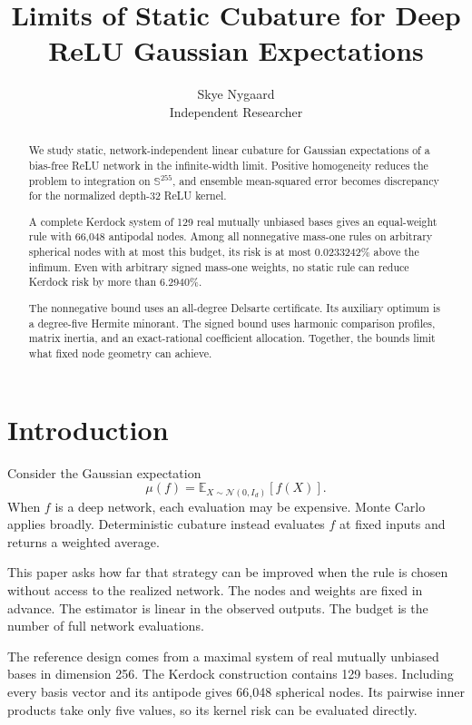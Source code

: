 \documentclass[11pt]{article}
\title{Limits of Static Cubature for Deep ReLU Gaussian Expectations}
\author{Skye Nygaard\\\small Independent Researcher}
\date{}
\begin{document}
\maketitle
\begin{abstract}
We study static, network-independent linear cubature for Gaussian
expectations of a bias-free ReLU network in the infinite-width limit.
Positive homogeneity reduces the problem to integration on
\(\mathbb{S}^{255}\), and ensemble mean-squared error becomes discrepancy
for the normalized depth-32 ReLU kernel.

A complete Kerdock system of 129 real mutually unbiased bases gives an
equal-weight rule with 66,048 antipodal nodes. Among all nonnegative
mass-one rules on arbitrary spherical nodes with at most this budget, its
risk is at most 0.0233242\% above the infimum. Even with arbitrary signed
mass-one weights, no static rule can reduce Kerdock risk by more than
6.2940\%.

The nonnegative bound uses an all-degree Delsarte certificate. Its auxiliary
optimum is a degree-five Hermite minorant. The signed bound uses harmonic
comparison profiles, matrix inertia, and an exact-rational coefficient
allocation. Together, the bounds limit what fixed node geometry can achieve.
\end{abstract}

\section{Introduction}\label{introduction}

Consider the Gaussian expectation
\[
\mu(f)=\mathbb{E}_{X\sim\mathcal{N}(0,I_d)}[f(X)].
\]
When \(f\) is a deep network, each evaluation may be expensive. Monte
Carlo applies broadly. Deterministic cubature instead evaluates \(f\) at
fixed inputs and returns a weighted average.

This paper asks how far that strategy can be improved when the rule is
chosen without access to the realized network. The nodes and weights are
fixed in advance. The estimator is linear in the observed outputs. The
budget is the number of full network evaluations.

The reference design comes from a maximal system of real mutually unbiased
bases in dimension 256. The Kerdock construction contains 129 bases.
Including every basis vector and its antipode gives 66,048 spherical nodes.
Its pairwise inner products take only five values, so its kernel risk can
be evaluated directly.
\end{document}
